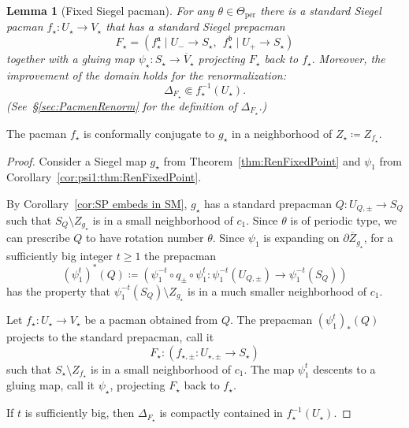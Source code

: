 \documentclass[]{amsart}
\renewcommand{\sp}{{\ \ }}
\newcommand{\bDelta}{{\mathbb{\Delta}}}
\newcommand{\str}{{\star}}
\renewcommand{\aa}{{\mathfrak{a}}}
\newcommand{\bb}{{\mathfrak{b}}}
\newtheorem{lem}[thm]{Lemma}
\theoremstyle{remark}
\numberwithin{equation}{section}
\theoremstyle{definition}
\newcommand{\per}{{\mathrm{per}}}
\begin{document}
\begin{lem}[Fixed Siegel pacman]
\label{lem:FixedSiegelPacman}
For any $\theta\in \Theta_\per$ there is a standard Siegel pacman $f_\str\colon U_\str\to V_\str$ that has a standard Siegel prepacman \[F_\str = (f^\aa_\str\mid U_-\to S_\str, \sp f^\bb_\str\mid U_+ \to S_\str)\] together with a gluing map $\psi_\str\colon S_\str\to \overline V_\str$ projecting $F_\str$ back to $f_\str.$ Moreover, the improvement of the domain holds for the renormalization:  
\begin{equation}
\label{eq:lem:FixedSiegelPacman}
\bDelta_{F_\str}\Subset f_\str^{-1}(U_\str).
\end{equation} (See~\rm{\S\ref{sec:PacmenRenorm}} for the definition of $\bDelta_{F_\str}$.)
\end{lem}
\noindent The pacman $f_\str$ is conformally conjugate to $g_{\str}$ in a neighborhood of $Z_{\str}\coloneqq Z_{f_\str}.$ 
\begin{proof}
Consider a Siegel map $g_\str$ from Theorem~\ref{thm:RenFixedPoint} and $\psi_1$ from Corollary~\ref{cor:psi1:thm:RenFixedPoint}.

By Corollary~\ref{cor:SP embeds in SM},  $g_\str$ has a standard prepacman $Q\colon U_{Q, \pm}\to S_Q$ such that $S_Q\setminus Z_{g_\str}$ is in a small neighborhood of $c_1$. Since $\theta$ is of periodic type, we can prescribe $Q$ to have rotation number $\theta$. Since $\psi_1$ is expanding on $\partial \overline Z_{g_\str}$, for a sufficiently big integer $t\ge 1$ the prepacman \[(\psi_1^t)^* (Q)\coloneqq (\psi_1^{-t} \circ q_{\pm}\circ \psi_1^{ t}\colon \psi_1^{-t}(U_{Q,\pm})\to \psi_1^{-t} (S_{Q}) )\]
 has the property that $\psi_1^{-t} (S_{Q})\setminus Z_{g_\str}$ is in a much smaller neighborhood of $c_1$.
 
 Let $f_\str\colon U_\str\to V_\str$ be a pacman obtained from $Q$. The prepacman $(\psi_1^t)_* (Q)$ projects to the standard prepacman, call it 
 \[F_\str\colon (f_{\str,\pm}\colon U_{\str,\pm}\to S_{\str})\]
 such that $S_\str\setminus Z_{f_\str}$ is in a small neighborhood of $c_1$. The map $\psi_1^{t}$ descents to a gluing map, call it $\psi_\str$, projecting $F_\str$ back to $f_\str$.
 

If $t$ is sufficiently big, then $\bDelta_{F_\str}$ is compactly contained in $f_\str^{-1}(U_\str)$.
\end{proof}
\end{document}
